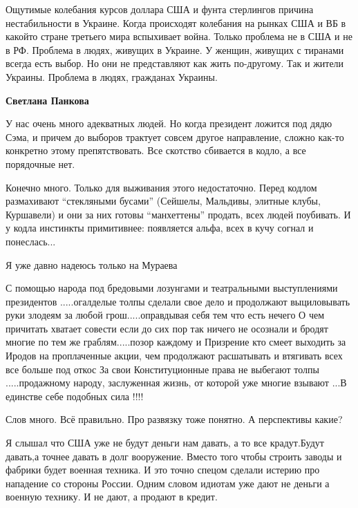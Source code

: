 \begin{itemize}

Ощутимые колебания курсов доллара США и фунта стерлингов причина нестабильности
в Украине. Когда происходят колебания на рынках США и ВБ в какойто стране
третьего мира вспыхивает война. Только проблема не в США и не в РФ. Проблема в
людях, живущих в Украине. У женщин, живущих с тиранами всегда есть выбор. Но
они не представляют как жить по-другому. Так и жители Украины. Проблема в
людях, гражданах Украины.

\begin{itemize} %
\textbf{Светлана Панкова} 

У нас очень много адекватных людей. Но когда президент ложится под дядю Сэма, и
причем до выборов трактует совсем другое направление, сложно как-то конкретно
этому препятствовать. Все скотство сбивается в кодло, а все порядочные нет.


Конечно много. Только для выживания этого недостаточно. Перед кодлом
размахивают \enquote{стекляными бусами} (Сейшелы, Мальдивы, элитные клубы, Куршавели) и
они за них готовы \enquote{манхеттены} продать, всех людей поубивать. И у кодла
инстинкты примитивнее: появляется альфа, всех в кучу согнал и понеслась...
\end{itemize} %

Я уже давно надеюсь только на Мураева


С помощью народа под бредовыми лозунгами и театральными выступлениями
президентов .....огалделые толпы сделали свое дело и продолжают выциловывать
руки злодеям за любой грош.....оправдывая себя тем что есть нечего О чем
причитать хватает совести если до сих пор так ничего не осознали и бродят
многие по тем же граблям.....позор каждому и Призрение кто смеет выходить за
Иродов на проплаченные акции, чем продолжают расшатывать и втягивать всех все
больше под откос За свои Конституционные права не выбегают толпы
.....продажному народу, заслуженная жизнь, от которой уже многие взывают ...В
единстве себе подобных сила !!!!


Слов много. Всё правильно. Про развязку тоже понятно. А перспективы какие?


Я слышал что США уже не будут деньги нам давать, а то все крадут.Будут давать,а
точнее давать в долг вооружение. Вместо того чтобы строить заводы и фабрики
будет военная техника. И это точно спецом сделали истерию про нападение со
стороны России. Одним словом идиотам уже дают не деньги а военную технику. И не
дают, а продают в кредит.


\end{itemize}
